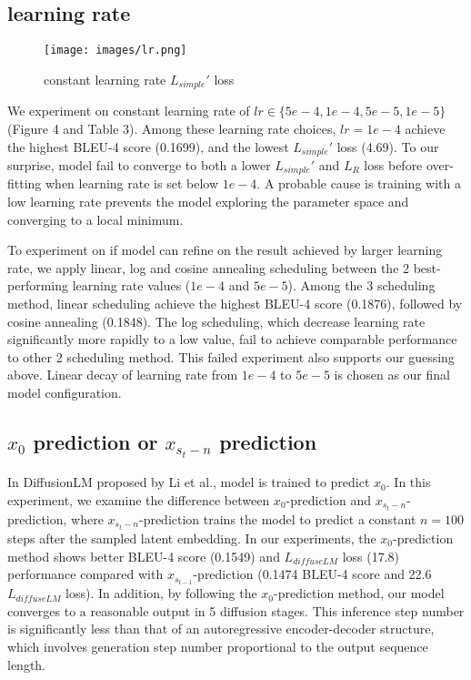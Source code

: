 \documentclass{article}
\begin{document}
\subsection{learning rate}
\label{sec:lr-exp}
\begin{figure}
  \centering
  \texttt{[image: images/lr.png]}
  \caption{constant learning rate $L_{simple}'$ loss}
  \label{fig:fusion}
\end{figure}

We experiment on constant learning rate of $lr \in \{5e-4, 1e-4, 5e-5, 1e-5\}$ (Figure 4 and Table 3). Among these learning rate choices, $lr = 1e-4$ achieve the highest BLEU-4 score (0.1699), and the lowest $L_{simple}'$ loss (4.69). To our surprise, model fail to converge to both a lower $L_{simple}'$ and $L_R$ loss before over-fitting when learning rate is set below $1e-4$. A probable cause is training with a low learning rate prevents the model exploring the parameter space and converging to a local minimum.

To experiment on if model can refine on the result achieved by larger learning rate, we apply linear, log and cosine annealing scheduling between the 2 best-performing learning rate values ($1e-4$ and $5e-5$). Among the 3 scheduling method, linear scheduling achieve the highest BLEU-4 score (0.1876), followed by cosine annealing (0.1848). The log scheduling, which decrease learning rate significantly more rapidly to a low value, fail to achieve comparable performance to other 2 scheduling method. This failed experiment also supports our guessing above. Linear decay of learning rate from $1e-4$ to $5e-5$ is chosen as our final model configuration. 

\subsection{$x_0$ prediction or $x_{s_t-n}$ prediction}
\label{sec:x0-exp}
In DiffusionLM proposed by Li et al.\cite{diffuselm}, model is trained to predict $x_0$. In this experiment, we examine the difference between $x_0$-prediction and $x_{s_t-n}$-prediction, where $x_{s_t-n}$-prediction trains the model to predict a constant $n = 100$ steps after the sampled latent embedding. In our experiments, the $x_0$-prediction method shows better BLEU-4 score (0.1549) and $L_{diffuseLM}$ loss (17.8) performance compared with $x_{s_{t-1}}$-prediction (0.1474 BLEU-4 score and 22.6 $L_{diffuseLM}$ loss). In addition, by following the $x_0$-prediction method, our model converges to a reasonable output in 5 diffusion stages. This inference step number is significantly less than that of an autoregressive encoder-decoder structure, which involves generation step number proportional to the output sequence length.
\end{document}
